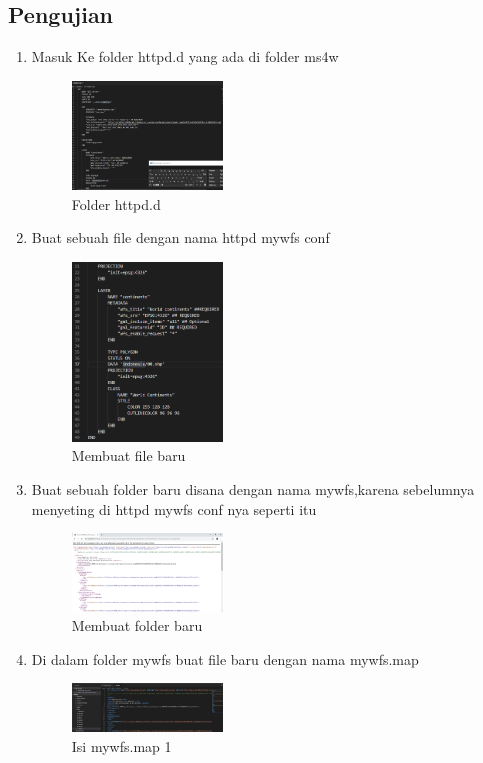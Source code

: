 \subsection{Pengujian}
\begin{enumerate}
  \item Masuk Ke folder httpd.d yang ada di folder ms4w
  \hfill\break
    \begin{figure}[H]
		\includegraphics[width=4cm]{figures/1174015/4/No10.png}
		\centering
		\caption{Folder httpd.d}
    \end{figure}

  \item Buat sebuah file dengan nama httpd mywfs conf
  \hfill\break
    \begin{figure}[H]
		\includegraphics[width=4cm]{figures/1174015/4/No11.png}
		\centering
		\caption{Membuat file baru}
    \end{figure}

  \item Buat sebuah folder baru disana dengan nama mywfs,karena sebelumnya menyeting di httpd mywfs conf nya seperti itu
  \hfill\break
    \begin{figure}[H]
		\includegraphics[width=4cm]{figures/1174015/4/No12.png}
		\centering
		\caption{Membuat folder baru}
    \end{figure}

  \item Di dalam folder mywfs buat file baru dengan nama mywfs.map
  \hfill\break
    \begin{figure}[H]
		\includegraphics[width=4cm]{figures/1174015/4/No13.png}
		\centering
		\caption{Isi mywfs.map 1}
    \end{figure}


\end{enumerate}
